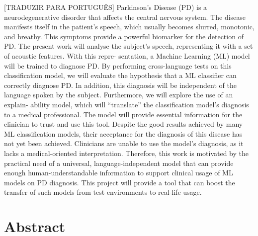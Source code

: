 [TRADUZIR PARA PORTUGUÊS] Parkinson’s Disease (PD) is a neurodegenerative disorder that affects the central nervous system. The disease manifests
itself in the patient’s speech, which usually becomes slurred, monotonic, and breathy. This symptoms provide a powerful
biomarker for the detection of PD.
The present work will analyse the subject’s speech, representing it with a set of acoustic features. With this repre-
sentation, a Machine Learning (ML) model will be trained to diagnose PD. By performing cross-language tests on this
classification model, we will evaluate the hypothesis that a ML classifier can correctly diagnose PD. In addition, this
diagnosis will be independent of the language spoken by the subject. Furthermore, we will explore the use of an explain-
ability model, which will “translate” the classification model’s diagnosis to a medical professional. The model will provide
essential information for the clinician to trust and use this tool.
Despite the good results achieved by many ML classification models, their acceptance for the diagnosis of this disease
has not yet been achieved. Clinicians are unable to use the model’s diagnosis, as it lacks a medical-oriented interpretation.
Therefore, this work is motivated by the practical need of a universal, language-independent model that can provide
enough human-understandable information to support clinical usage of ML models on PD diagnosis. This project will
provide a tool that can boost the transfer of such models from test environments to real-life usage.
\newpage


\chapter*{Abstract}
\thispagestyle{empty}

